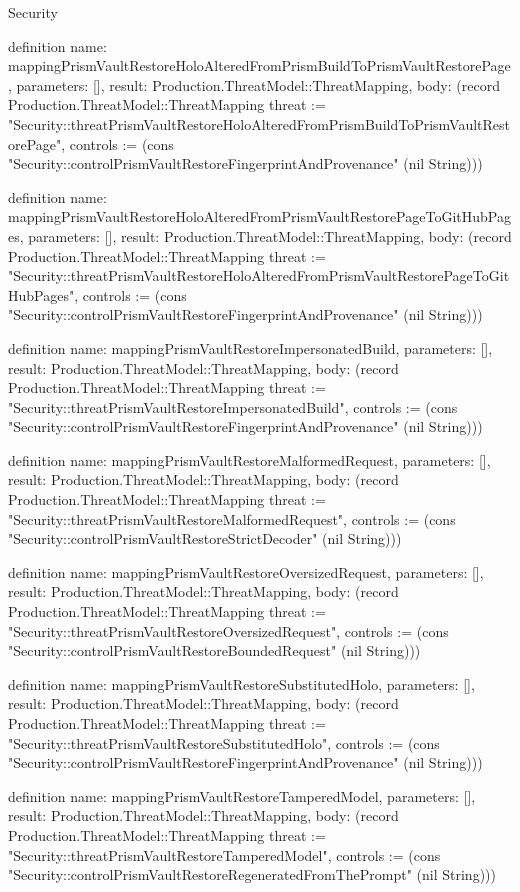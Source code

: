 \begin{lexlean}{Security}
\begin{semanticmodule}
definition{
  name: mappingPrismVaultRestoreHoloAlteredFromPrismBuildToPrismVaultRestorePage,
  parameters: [],
  result: Production.ThreatModel::ThreatMapping,
  body: (record Production.ThreatModel::ThreatMapping {threat := "Security::threatPrismVaultRestoreHoloAlteredFromPrismBuildToPrismVaultRestorePage", controls := (cons "Security::controlPrismVaultRestoreFingerprintAndProvenance" (nil String))})
}

definition{
  name: mappingPrismVaultRestoreHoloAlteredFromPrismVaultRestorePageToGitHubPages,
  parameters: [],
  result: Production.ThreatModel::ThreatMapping,
  body: (record Production.ThreatModel::ThreatMapping {threat := "Security::threatPrismVaultRestoreHoloAlteredFromPrismVaultRestorePageToGitHubPages", controls := (cons "Security::controlPrismVaultRestoreFingerprintAndProvenance" (nil String))})
}

definition{
  name: mappingPrismVaultRestoreImpersonatedBuild,
  parameters: [],
  result: Production.ThreatModel::ThreatMapping,
  body: (record Production.ThreatModel::ThreatMapping {threat := "Security::threatPrismVaultRestoreImpersonatedBuild", controls := (cons "Security::controlPrismVaultRestoreFingerprintAndProvenance" (nil String))})
}

definition{
  name: mappingPrismVaultRestoreMalformedRequest,
  parameters: [],
  result: Production.ThreatModel::ThreatMapping,
  body: (record Production.ThreatModel::ThreatMapping {threat := "Security::threatPrismVaultRestoreMalformedRequest", controls := (cons "Security::controlPrismVaultRestoreStrictDecoder" (nil String))})
}

definition{
  name: mappingPrismVaultRestoreOversizedRequest,
  parameters: [],
  result: Production.ThreatModel::ThreatMapping,
  body: (record Production.ThreatModel::ThreatMapping {threat := "Security::threatPrismVaultRestoreOversizedRequest", controls := (cons "Security::controlPrismVaultRestoreBoundedRequest" (nil String))})
}

definition{
  name: mappingPrismVaultRestoreSubstitutedHolo,
  parameters: [],
  result: Production.ThreatModel::ThreatMapping,
  body: (record Production.ThreatModel::ThreatMapping {threat := "Security::threatPrismVaultRestoreSubstitutedHolo", controls := (cons "Security::controlPrismVaultRestoreFingerprintAndProvenance" (nil String))})
}

definition{
  name: mappingPrismVaultRestoreTamperedModel,
  parameters: [],
  result: Production.ThreatModel::ThreatMapping,
  body: (record Production.ThreatModel::ThreatMapping {threat := "Security::threatPrismVaultRestoreTamperedModel", controls := (cons "Security::controlPrismVaultRestoreRegeneratedFromThePrompt" (nil String))})
}


\end{semanticmodule}
\end{lexlean}

